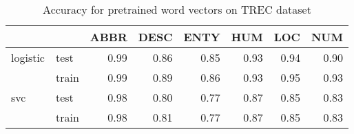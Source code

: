 \begin{table}[h]
\begin{center}

\begin{tabular}{llrrrrrr}
\toprule
 &&ABBR &DESC &ENTY &HUM &LOC &NUM \\
\midrule
logistic & test &0.99 &0.86 &0.85 & 0.93 & 0.94 & 0.90 \\
 & train &0.99 &0.89 &0.86 & 0.93 & 0.95 & 0.93 \\
svc & test &0.98 &0.80 &0.77 & 0.87 & 0.85 & 0.83 \\
 & train &0.98 &0.81 &0.77 & 0.87 & 0.85 & 0.83 \\
\bottomrule
\end{tabular}

\caption[Accuracy for pretrained word vectors on TREC dataset]{Accuracy for pretrained word vectors on TREC dataset}
\label{tab:}
\end{center}
\end{table}



\* %